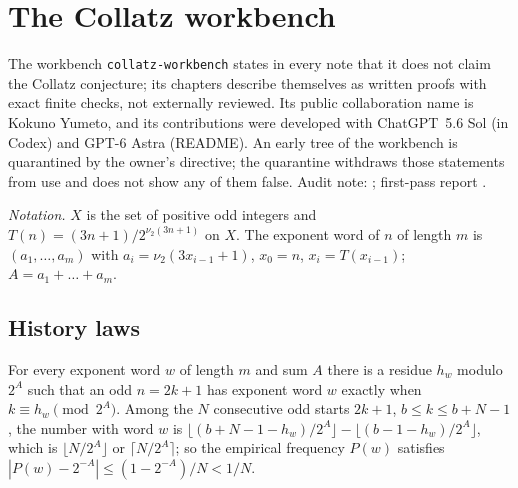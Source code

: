 \section{The Collatz workbench}\label{sec:collatz}

The workbench \texttt{collatz-workbench} states in every note that it does not claim the Collatz conjecture; its chapters describe themselves as written proofs with exact finite checks, not externally reviewed. Its public collaboration name is Kokuno Yumeto, and its contributions were developed with ChatGPT~5.6 Sol (in Codex) and GPT-6 Astra (README). An early tree of the workbench is quarantined by the owner's directive; the quarantine withdraws those statements from use and does not show any of them false.
Audit note: ; first-pass report .

\emph{Notation.} $X$ is the set of positive odd integers and $T(n)=(3n+1)/2^{\nu_2(3n+1)}$ on $X$. The exponent word of $n$ of length $m$ is $(a_1,\dots,a_m)$ with $a_i=\nu_2(3x_{i-1}+1)$, $x_0=n$, $x_i=T(x_{i-1})$; $A=a_1+\dots+a_m$.

\subsection{History laws}

\begin{proposition}[cylinders]\label{prop:cyl}
For every exponent word $w$ of length $m$ and sum $A$ there is a residue $h_w$ modulo $2^A$ such that an odd $n=2k+1$ has exponent word $w$ exactly when $k\equiv h_w\pmod{2^A}$. Among the $N$ consecutive odd starts $2k+1$, $b\le k\le b+N-1$, the number with word $w$ is $\lfloor(b+N-1-h_w)/2^A\rfloor-\lfloor(b-1-h_w)/2^A\rfloor$, which is $\lfloor N/2^A\rfloor$ or $\lceil N/2^A\rceil$; so the empirical frequency $P(w)$ satisfies $|P(w)-2^{-A}|\le(1-2^{-A})/N<1/N$.
\end{proposition}

